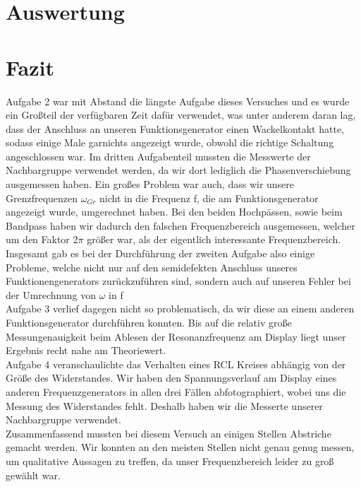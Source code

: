 \documentclass[12pt]{scrartcl}
\begin{document}
\section{Auswertung}

\section{Fazit}
Aufgabe 2 war mit Abstand die längste Aufgabe dieses Versuches und es wurde ein Großteil der verfügbaren Zeit dafür verwendet, was unter anderem daran lag, dass der Anschluss an unseren Funktionsgenerator einen Wackelkontakt hatte, sodass einige Male garnichts angezeigt wurde, obwohl die richtige Schaltung angeschlossen war. Im dritten Aufgabenteil mussten die Messwerte der Nachbargruppe verwendet werden, da wir dort lediglich die Phasenverschiebung ausgemessen haben. Ein großes Problem war auch, dass wir unsere Grenzfrequenzen $\omega_{Gr}$ nicht in die Frequenz f, die am Funktionsgenerator angezeigt wurde, umgerechnet haben. Bei den beiden Hochpässen, sowie beim Bandpass haben wir dadurch den falschen Frequenzbereich ausgemessen, welcher um den Faktor 2$\pi$ größer war, als der eigentlich interessante Frequenzbereich. Insgesamt gab es bei der Durchführung der zweiten Aufgabe also einige Probleme, welche nicht nur auf den semidefekten Anschluss unseres Funktionengenerators zurückzuführen sind, sondern auch auf unseren Fehler bei der Umrechnung von $\omega$ in f\\
Aufgabe 3 verlief dagegen nicht so problematisch, da wir diese an einem anderen Funktionsgenerator durchführen konnten. Bis auf die relativ große Messungenauigkeit beim Ablesen der Resonanzfrequenz am Display liegt unser Ergebnis recht nahe am Theoriewert.\\
Aufgabe 4 veranschaulichte das Verhalten eines RCL Kreises abhängig von der Größe des Widerstandes. Wir haben den Spannungsverlauf am Display eines anderen Frequenzgenerators in allen drei Fällen abfotographiert, wobei uns die Messung des Widerstandes fehlt. Deshalb haben wir die Messerte unserer Nachbargruppe verwendet.\\
Zusammenfassend mussten bei diesem Versuch an einigen Stellen Abstriche gemacht werden. Wir konnten an den meisten Stellen nicht genau genug messen, um qualitative Aussagen zu treffen, da unser Frequenzbereich leider zu groß gewählt war.
\end{document}
